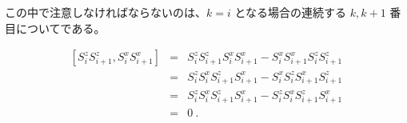 \documentclass[11pt, a4]{report}
\begin{document}
この中で注意しなければならないのは、$k=i$ となる場合の連続する $k, k+1$ 番目についてである。

\begin{eqnarray}
 \left [
S_{i}^z S_{i+1}^z,
S_{i}^x S_{i+1}^x
 \right ] &=&
S_{i}^z S_{i+1}^z S_{i}^x S_{i+1}^x - S_{i}^x S_{i+1}^x S_{i}^z S_{i+1}^z \nonumber \\
&=&
S_{i}^z S_{i}^x  S_{i+1}^z S_{i+1}^x - S_{i}^x S_{i}^z S_{i+1}^x  S_{i+1}^z \nonumber \\
&=&
S_{i}^z S_{i}^x  S_{i+1}^z S_{i+1}^x - S_{i}^z S_{i}^x  S_{i+1}^z S_{i+1}^x \nonumber \\
&=& 0 \ .
\end{eqnarray}
\end{document}
